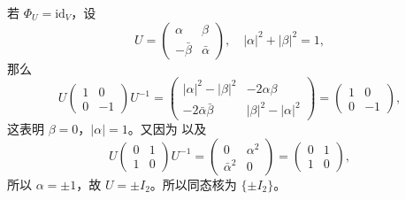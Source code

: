 \begin{example}
  若 $\Phi_U=\mathrm{id}_V$，设 
  \[
      U=\begin{pmatrix}
        \alpha & \beta \\
        -\bar\beta & \bar\alpha
      \end{pmatrix},\quad |\alpha|^2+|\beta|^2=1,
  \]
  那么 
  \[
      U\begin{pmatrix}
        1 & 0 \\
        0 & -1
      \end{pmatrix}U^{-1}=
      \begin{pmatrix}
        |\alpha|^2-|\beta|^2 & -2\alpha\beta \\
        -2\bar\alpha\bar\beta & |\beta|^2-|\alpha|^2
      \end{pmatrix}=
      \begin{pmatrix}
        1 & 0 \\
        0 & -1
      \end{pmatrix},
  \]
  这表明 $\beta=0$，$|\alpha|=1$。又因为
  以及
  \[
      U\begin{pmatrix}
        0 & 1 \\
        1 & 0
      \end{pmatrix}U^{-1}=
      \begin{pmatrix}
        0 & \alpha^2 \\
        \bar\alpha^2 & 0
      \end{pmatrix}
      =
      \begin{pmatrix}
        0 & 1 \\
        1 & 0
      \end{pmatrix},
  \]
  所以 $\alpha=\pm 1$，故 $U=\pm I_2$。所以同态核为 $\{\pm I_2\}$。
\end{example}

